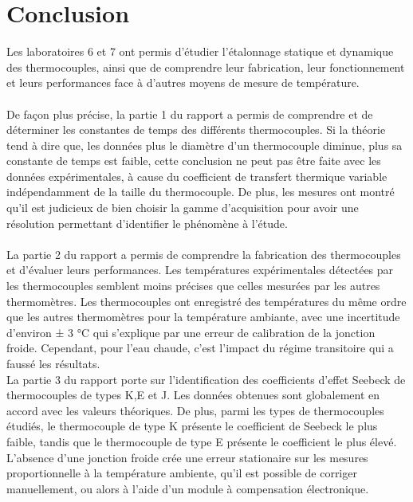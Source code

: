 \documentclass[11pt,twoside]{article}
\numberwithin{figure}{section}
\begin{document}
\section{Conclusion}
Les laboratoires 6 et 7 ont permis d’étudier l’étalonnage statique et dynamique des thermocouples, ainsi que de comprendre leur fabrication, leur fonctionnement et leurs performances face à d'autres moyens de mesure de température.
\\
\\
De façon plus précise, la partie 1 du rapport a permis de comprendre et de déterminer les constantes de temps des différents thermocouples. Si la théorie tend à dire que, les données plus le diamètre d’un thermocouple diminue, plus sa constante de temps est faible, cette conclusion ne peut pas être faite avec les données expérimentales, à cause du coefficient de transfert thermique variable indépendamment de la taille du thermocouple. De plus, les mesures ont montré qu'il est judicieux de bien choisir la gamme d'acquisition pour avoir une résolution permettant d'identifier le phénomène à l'étude.
\\
\\
La partie 2 du rapport a permis de comprendre la fabrication des thermocouples et d’évaluer leurs performances. Les températures expérimentales détectées par les thermocouples semblent moins précises que celles mesurées par les autres thermomètres. Les thermocouples ont enregistré des températures du même ordre que les autres thermomètres pour la température ambiante, avec une incertitude d’environ ± 3 °C qui s'explique par une erreur de calibration de la jonction froide. Cependant, pour l’eau chaude, c'est l'impact du régime transitoire qui a faussé les résultats.
\\
La partie 3 du rapport porte sur l’identification des coefficients d’effet Seebeck de thermocouples de types K,E et J. Les données obtenues sont globalement en accord avec les valeurs théoriques. De plus, parmi les types de thermocouples étudiés, le thermocouple de type K présente le coefficient de Seebeck le plus faible, tandis que le thermocouple de type E présente le coefficient le plus élevé. L'absence d'une jonction froide crée une erreur stationaire sur les mesures proportionnelle à la température ambiente, qu'il est possible de corriger manuellement, ou alors à l'aide d'un module à compensation électronique. 
\\
\\
\end{document}
